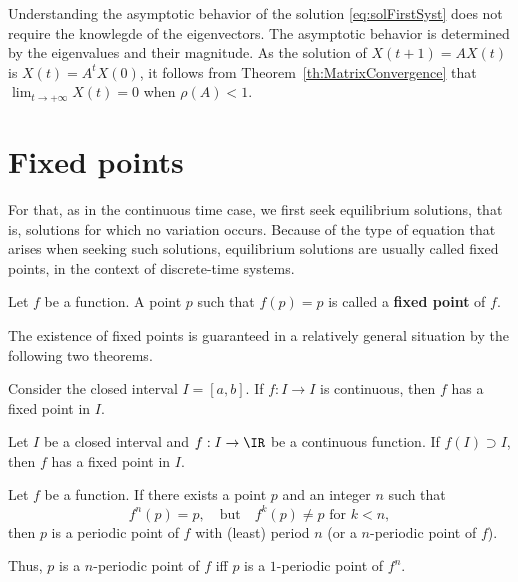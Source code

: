 Understanding the asymptotic behavior of the solution \eqref{eq:solFirstSyst} does not require the knowlegde of the eigenvectors. The asymptotic behavior is determined by the eigenvalues and their magnitude.
As the solution of $X(t+1)=AX(t)$ is $X(t)=A^tX(0)$, it follows from Theorem~\ref{th:MatrixConvergence} that $\lim_{t\rightarrow + \infty} X(t)=0$ when $\rho(A)<1$.



\section{Fixed points}
For that, as in the continuous time case, we first seek equilibrium solutions, that is, solutions for which no variation occurs. Because of the type of equation that arises when seeking such solutions, equilibrium solutions are usually called fixed points, in the context of discrete-time systems.

\begin{definition}
Let $f$ be a function. A point $p$ such that $f(p)=p$ is called a \textbf{fixed point} of $f$.
\end{definition}
The existence of fixed points is guaranteed in a relatively general situation by the following two theorems.
\begin{theorem}
Consider the closed interval $I=[a,b]$. If $f:I\to I$ is continuous, then $f$ has a fixed point in $I$.
\end{theorem}
\begin{theorem}
Let $I$ be a closed interval and $f:I\to\IR$ be a continuous function. If $f(I)\supset I$, then $f$ has a fixed point in $I$.
\end{theorem}

\begin{definition}
Let $f$ be a function. If there exists a point $p$ and an integer $n$ such that
\[
f^n(p)=p,\quad\textrm{but}\quad f^k(p)\neq p\textrm{ for }k<n,
\]
then $p$ is a periodic point of $f$ with (least) period $n$ (or a $n$-periodic point of $f$).
\end{definition}
\vskip0.5cm
Thus, $p$ is a $n$-periodic point of $f$ iff $p$ is a $1$-periodic point of $f^n$.


